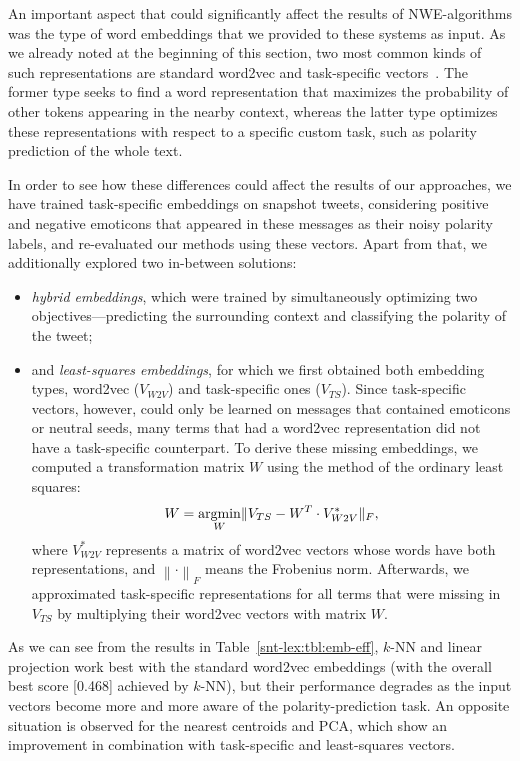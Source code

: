 An important aspect that could significantly affect the results of
NWE-algorithms was the type of word embeddings that we provided to
these systems as input.  As we already noted at the beginning of this
section, two most common kinds of such representations are standard
word2vec and task-specific vectors~\cite{Mikolov:13,Collobert:11}.
The former type seeks to find a word representation that maximizes the
probability of other tokens appearing in the nearby context, whereas
the latter type optimizes these representations with respect to a
specific custom task, such as polarity prediction of the whole text.

In order to see how these differences could affect the results of our
approaches, we have trained task-specific embeddings on snapshot
tweets, considering positive and negative emoticons that appeared in
these messages as their noisy polarity labels, and re-evaluated our
methods using these vectors.  Apart from that, we additionally
explored two in-between solutions:
\begin{itemize}
\item \emph{hybrid embeddings}, which were trained by simultaneously
  optimizing two objectives---predicting the surrounding context and
  classifying the polarity of the tweet;
\item and \emph{least-squares embeddings}, for which we first obtained
  both embedding types, word2vec ($V_{W2V}$) and task-specific ones
  ($V_{TS}$).  Since task-specific vectors, however, could only be
  learned on messages that contained emoticons or neutral seeds, many
  terms that had a word2vec representation did not have a
  task-specific counterpart.  To derive these missing embeddings, we
  computed a transformation matrix $W$ using the method of the
  ordinary least squares:
  \begin{equation}\label{eq:fgsa:least-sq}
    W = \argmin_{W}\lVert V_{TS} - W^T\cdot V^*_{W2V}\rVert_F,
  \end{equation}
  where $V^*_{W2V}$ represents a matrix of word2vec vectors whose
  words have both representations, and
  $\left\lVert\cdot\right\rVert_F$ means the Frobenius norm.
  Afterwards, we approximated task-specific representations for all
  terms that were missing in $V_{TS}$ by multiplying their word2vec
  vectors with matrix $W$.
\end{itemize}

As we can see from the results in Table~\ref{snt-lex:tbl:emb-eff},
$k$-NN and linear projection work best with the standard word2vec
embeddings (with the overall best score [0.468] achieved by $k$-NN),
but their performance degrades as the input vectors become more and
more aware of the polarity-prediction task.  An opposite situation is
observed for the nearest centroids and PCA, which show an improvement
in combination with task-specific and least-squares vectors.

